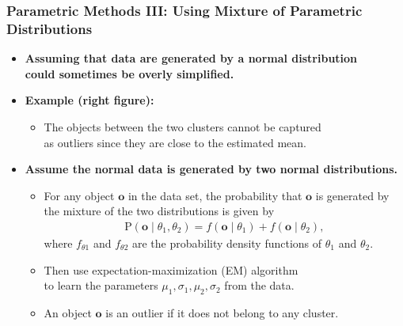 \begin{frame}
  \frametitle{Parametric Methods III: Using Mixture of Parametric Distributions}
  \begin{itemize}
  \item \textbf{Assuming that data are generated by a normal distribution \\ could sometimes be overly simplified.}
  \item \textbf{Example (right figure):}
    \begin{itemize}
    \item The objects between the two clusters cannot be captured \\
      as outliers since they are close to the estimated mean.
    \end{itemize}
  \item \textbf{Assume the normal data is generated by {\color{airforceblue}two normal distributions.}}
    \begin{itemize}
    \item For any object $\mathbf{o}$ in the data set, the probability that $\mathbf{o}$ is generated by the mixture of the two distributions is given by
      \begin{align}
        \text{P}(\mathbf{o} \; \vert \; \theta_1, \theta_2) = f(\mathbf{o} \; \vert \; \theta_1) + f(\mathbf{o} \; \vert \; \theta_2),
      \end{align}
      where $f_{\theta 1}$ and $f_{\theta 2}$ are the probability density functions of $\theta_1$ and $\theta_2$.
    \item Then use expectation-maximization (EM) algorithm \\
      to learn the parameters $\mu_1, \sigma_1, \mu_2, \sigma_2$ from the data.
    \item An object $\mathbf{o}$ is an outlier if it does not belong to any cluster.
    \end{itemize}
  \end{itemize}
\end{frame}


